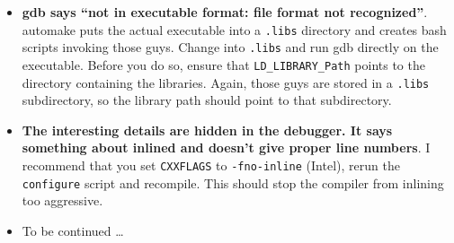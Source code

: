 \begin{itemize}
  \item \textbf{gdb says ``not in executable format: file format not
    recognized''}. automake puts the actual executable into a \texttt{.libs}
    directory and creates bash scripts invoking those guys. Change into
    \texttt{.libs} and run gdb directly on the executable. Before you do so,
    ensure that \texttt{LD\_LIBRARY\_Path} points to the directory containing
    the libraries. Again, those guys are stored in a \texttt{.libs}
    subdirectory, so the library path should point to that subdirectory. 
  \item \textbf{The interesting details are hidden in the debugger. It says
    something about inlined and doesn't give proper line numbers}.
    I recommend that you set \texttt{CXXFLAGS} to \texttt{-fno-inline} (Intel),
    rerun the \texttt{configure} script and recompile. This should stop the
    compiler from inlining too aggressive.
  \item To be continued \dots
\end{itemize}
 
 
 
 



